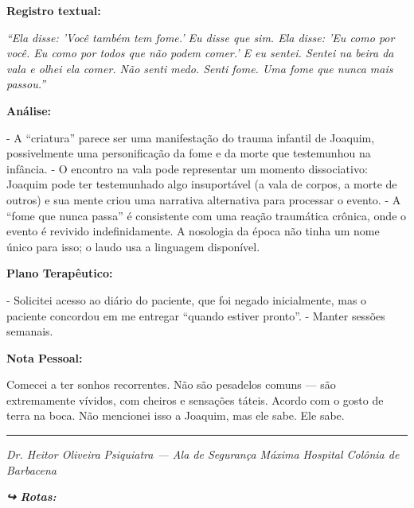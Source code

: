 \noindent \textbf{Registro textual:}

\noindent \textit{\textquotedblleft{}Ela disse: 'Você também tem fome.' Eu disse que sim. Ela disse: 'Eu como por você. Eu como por todos que não podem comer.' E eu sentei. Sentei na beira da vala e olhei ela comer. Não senti medo. Senti fome. Uma fome que nunca mais passou.\textquotedblright{}}

\noindent \textbf{Análise:}

\noindent - A \textquotedblleft{}criatura\textquotedblright{} parece ser uma manifestação do trauma infantil de Joaquim, possivelmente uma personificação da fome e da morte que testemunhou na infância.
- O encontro na vala pode representar um momento dissociativo: Joaquim pode ter testemunhado algo insuportável (a vala de corpos, a morte de outros) e sua mente criou uma narrativa alternativa para processar o evento.
- A \textquotedblleft{}fome que nunca passa\textquotedblright{} é consistente com uma reação traumática crônica, onde o evento é revivido indefinidamente. A nosologia da época não tinha um nome único para isso; o laudo usa a linguagem disponível.

\noindent \textbf{Plano Terapêutico:}

\noindent - Solicitei acesso ao diário do paciente, que foi negado inicialmente, mas o paciente concordou em me entregar \textquotedblleft{}quando estiver pronto\textquotedblright{}.
- Manter sessões semanais.

\noindent \textbf{Nota Pessoal:}

\noindent Comecei a ter sonhos recorrentes. Não são pesadelos comuns --- são extremamente vívidos, com cheiros e sensações táteis. Acordo com o gosto de terra na boca. Não mencionei isso a Joaquim, mas ele sabe. Ele sabe.

\vspace{0.5em}\noindent\rule{\textwidth}{0.5pt}\vspace{0.5em}

\noindent \textit{Dr. Heitor Oliveira}
\textit{Psiquiatra --- Ala de Segurança Máxima}
\textit{Hospital Colônia de Barbacena}

\vspace{0.5em}
\noindent\textit{\textbf{↪ Rotas:}  \rotasep {} \rotasep {}}